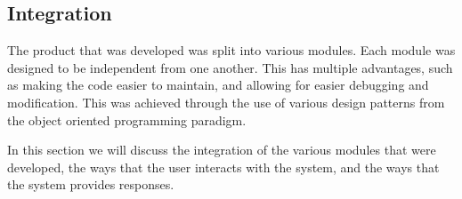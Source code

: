 \subsection{Integration}

The product that was developed was split into various modules. Each module was designed to be independent from one another. This has multiple advantages, such as making the code easier to maintain, and allowing for easier debugging and modification. This was achieved through the use of various design patterns from the object oriented programming paradigm.

In this section we will discuss the integration of the various modules that were developed, the ways that the user interacts with the system, and the ways that the system provides responses.
